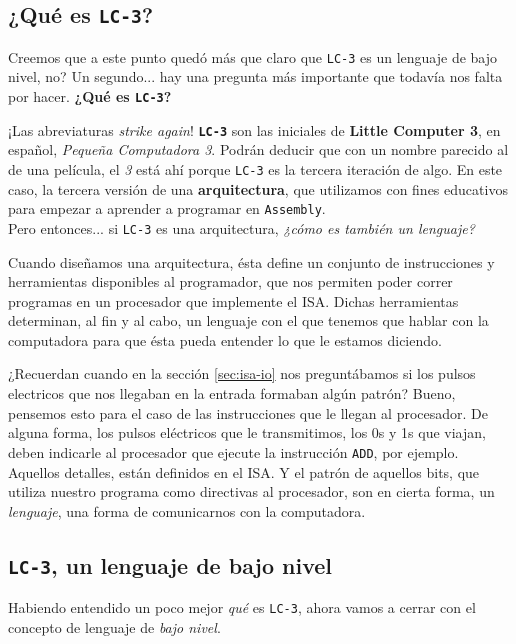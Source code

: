 \documentclass[a4paper, titlepage]{report}
\begin{document}
	
	\subsection{¿Qué es \texttt{LC-3}?}
	
	Creemos que a este punto quedó más que claro que \texttt{LC-3} es un lenguaje de bajo nivel, no? Un segundo... hay una pregunta más importante que todavía nos falta por hacer. \textbf{¿Qué es \texttt{LC-3}?}
	
	¡Las abreviaturas \textit{strike again}! \texttt{\textbf{LC-3}} son las iniciales de \textbf{Little Computer 3}, en español, \textit{Pequeña Computadora 3}. Podrán deducir que con un nombre parecido al de una película, el \textit{3} está ahí porque \texttt{LC-3} es la tercera iteración de algo. En este caso, la tercera versión de una \textbf{arquitectura}, que utilizamos con fines educativos para empezar a aprender a programar en \texttt{Assembly}.\\
	
	Pero entonces... si \texttt{LC-3} es una arquitectura, \textit{¿cómo es también un lenguaje?}
	
	Cuando diseñamos una arquitectura, ésta define un conjunto de instrucciones y herramientas disponibles al programador, que nos permiten poder correr programas en un procesador que implemente el ISA. Dichas herramientas determinan, al fin y al cabo, un lenguaje con el que tenemos que hablar con la computadora para que ésta pueda entender lo que le estamos diciendo.
	
	¿Recuerdan cuando en la sección \ref{sec:isa-io} nos preguntábamos si los pulsos electricos que nos llegaban en la entrada formaban algún patrón? Bueno, pensemos esto para el caso de las instrucciones que le llegan al procesador. De alguna forma, los pulsos eléctricos que le transmitimos, los 0s y 1s que viajan, deben indicarle al procesador que ejecute la instrucción \texttt{ADD}, por ejemplo. Aquellos detalles, están definidos en el ISA. Y el patrón de aquellos bits, que utiliza nuestro programa como directivas al procesador, son en cierta forma, un \textit{lenguaje}, una forma de comunicarnos con la computadora.\\
	
	\subsection{\texttt{LC-3}, un lenguaje de bajo nivel}
	\label{sec:lc3-low-level}
	
	Habiendo entendido un poco mejor \textit{qué} es \texttt{LC-3}, ahora vamos a cerrar con el concepto de lenguaje de \textit{bajo nivel}.
	
\end{document}
